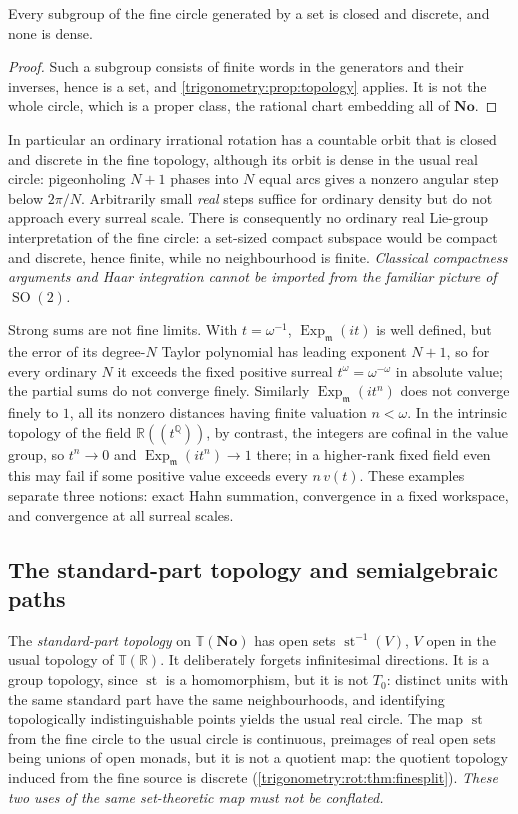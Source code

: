 \documentclass[11pt,letterpaper]{article}
\numberwithin{equation}{section}
\theoremstyle{definition}
\theoremstyle{remark}
\newcommand{\No}{\mathbf{No}}
\newcommand{\R}{\mathbb R}
\newcommand{\Q}{\mathbb Q}
\newcommand{\mm}{\mathfrak m}
\newcommand{\TT}{\mathbb T}
\newcommand{\st}{\operatorname{st}}
\newcommand{\Ex}{\operatorname{Exp}_{\mm}}
\newcommand{\SO}{\operatorname{SO}}
\begin{document}
\begin{corollary}\label{trigonometry:rot:cor:subgroups}
Every subgroup of the fine circle generated by a set is closed and discrete, and none is dense.
\end{corollary}
\begin{proof}
Such a subgroup consists of finite words in the generators and their inverses, hence is a set, and
\cref{trigonometry:prop:topology} applies. It is not the whole circle, which is a proper class, the
rational chart embedding all of $\No$.
\end{proof}
In particular an ordinary irrational rotation has a countable orbit that is closed and discrete in
the fine topology, although its orbit is dense in the usual real circle: pigeonholing $N+1$ phases
into $N$ equal arcs gives a nonzero angular step below $2\pi/N$. Arbitrarily small \emph{real} steps
suffice for ordinary density but do not approach every surreal scale. There is consequently no
ordinary real Lie-group interpretation of the fine circle: a set-sized compact subspace would be
compact and discrete, hence finite, while no neighbourhood is finite. \emph{Classical compactness
arguments and Haar integration cannot be imported from the familiar picture of $\SO(2)$.}

Strong sums are not fine limits. With $t=\omega^{-1}$, $\Ex(it)$ is well defined, but the error of its
degree-$N$ Taylor polynomial has leading exponent $N+1$, so for every ordinary $N$ it exceeds the
fixed positive surreal $t^\omega=\omega^{-\omega}$ in absolute value; the partial sums do not converge
finely. Similarly $\Ex(it^n)$ does not converge finely to $1$, all its nonzero distances having finite
valuation $n<\omega$. In the intrinsic topology of the field $\R((t^{\Q}))$, by contrast, the integers
are cofinal in the value group, so $t^n\to0$ and $\Ex(it^n)\to1$ there; in a higher-rank fixed field
even this may fail if some positive value exceeds every $n\,v(t)$. These examples separate three
notions: exact Hahn summation, convergence in a fixed workspace, and convergence at all surreal
scales.

\subsection{The standard-part topology and semialgebraic paths}
\label{trigonometry:rot:sec:othergeometry}
The \emph{standard-part topology} on $\TT(\No)$ has open sets $\st^{-1}(V)$, $V$ open in the usual
topology of $\TT(\R)$. It deliberately forgets infinitesimal directions. It is a group topology, since
$\st$ is a homomorphism, but it is not $T_0$: distinct units with the same standard part have the same
neighbourhoods, and identifying topologically indistinguishable points yields the usual real circle.
The map $\st$ from the fine circle to the usual circle is continuous, preimages of real open sets
being unions of open monads, but it is not a quotient map: the quotient topology induced from the
fine source is discrete (\cref{trigonometry:rot:thm:finesplit}). \emph{These two uses of the same
set-theoretic map must not be conflated.}
\end{document}
